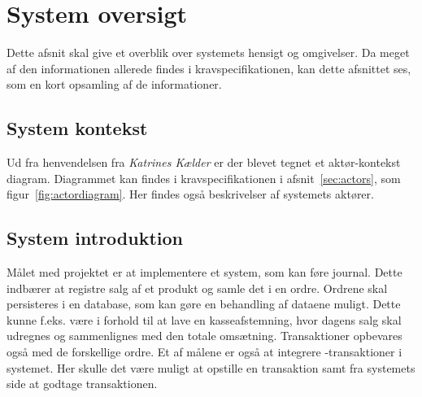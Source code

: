 \section{System oversigt}
Dette afsnit skal give et overblik over systemets hensigt og omgivelser. Da meget af den informationen allerede findes i kravspecifikationen, kan dette afsnittet ses, som en kort opsamling af de informationer.

\subsection{System kontekst}
Ud fra henvendelsen fra \textit{Katrines Kælder} er der blevet tegnet et aktør-kontekst diagram. Diagrammet kan findes i kravspecifikationen i afsnit~\ref{sec:actors}, som figur~\ref{fig:actordiagram}. Her findes også beskrivelser af systemets aktører.

\subsection{System introduktion}
Målet med projektet er at implementere et system, som kan føre journal. Dette indbærer at registre salg af et produkt og samle det i en ordre. Ordrene skal persisteres i en database, som kan gøre en behandling af dataene muligt. Dette kunne f.eks. være i forhold til at lave en kasseafstemning, hvor dagens salg skal udregnes og sammenlignes med den totale omsætning. Transaktioner opbevares også med de forskellige ordre.
\newline\newline
Et af målene er også at integrere -transaktioner i systemet. Her skulle det være muligt at opstille en transaktion samt fra systemets side at godtage transaktionen.